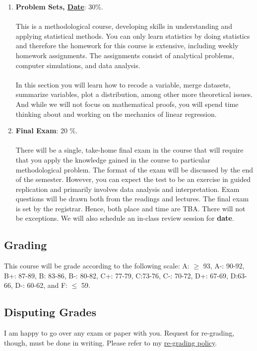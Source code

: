 \documentclass[letterpaper]{article}
\begin{document}
\begin{enumerate}
	\item {\bf Problem Sets, \underline{Date}}: 30\%. 
	\\
	\\
	This is a methodological course, developing skills in understanding and applying statistical methods. You can only learn statistics by doing statistics and therefore the homework for this course is extensive, including weekly homework assignments. The assignments consist of analytical problems, computer simulations, and data analysis. 
	\\
	\\
	In this section you will learn how to recode a variable, merge datasets, summarize variables, plot a distribution, among other more theoretical issues. And while we will not focus on mathematical proofs, you will spend time thinking about and working on the mechanics of linear regression.


	\item {\bf Final Exam}: 20 \%. 
	\\
	\\
	There will be a single, take-home final exam in the course that will require that you apply the knowledge gained in the course to particular methodological problem. The format of the exam will be discussed by the end of the semester. However, you can expect the test to be an exercise in guided replication and primarily involves data analysis and interpretation.	Exam questions will be drawn both from the readings and lectures. The final exam is set by the registrar. Hence, both place and time are TBA. There will not be exceptions. We will also schedule an in-class review session for {\bf date}. 

\end{enumerate}




\subsection*{Grading}

This course will be grade according to the following scale: 
A: $\geq$ 93, A-: 90-92, B+: 87-89, B: 83-86, B-: 80-82, C+: 77-79, C:73-76, C-: 70-72, D+: 67-69, D:63-66, D-: 60-62, and F: $\leq$ 59. 

\subsection*{Disputing Grades}

I am happy to go over any exam or paper with you. Request for re-grading, though, must be done in writing. Please refer to my \href{https://github.com/hbahamonde/hbahamonde.github.io/raw/master/resources/ReGrade_Policy.pdf}{re-grading policy}.
\end{document}
